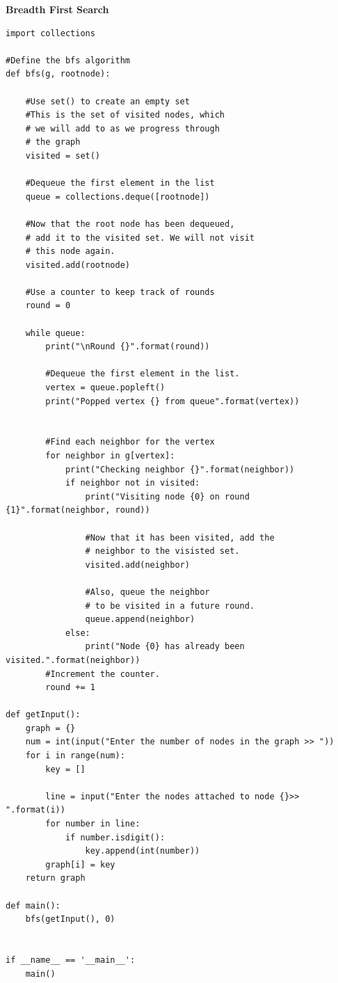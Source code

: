 \documentclass{article}
\begin{document}
\textbf{Breadth First Search}
\begin{lstlisting}
import collections

#Define the bfs algorithm
def bfs(g, rootnode):

    #Use set() to create an empty set
    #This is the set of visited nodes, which 
    # we will add to as we progress through 
    # the graph
    visited = set()

    #Dequeue the first element in the list
    queue = collections.deque([rootnode])

    #Now that the root node has been dequeued,
    # add it to the visited set. We will not visit
    # this node again. 
    visited.add(rootnode)

    #Use a counter to keep track of rounds
    round = 0

    while queue: 
        print("\nRound {}".format(round))

        #Dequeue the first element in the list. 
        vertex = queue.popleft()
        print("Popped vertex {} from queue".format(vertex))


        #Find each neighbor for the vertex
        for neighbor in g[vertex]: 
            print("Checking neighbor {}".format(neighbor))
            if neighbor not in visited: 
                print("Visiting node {0} on round {1}".format(neighbor, round))

                #Now that it has been visited, add the
                # neighbor to the visisted set. 
                visited.add(neighbor) 

                #Also, queue the neighbor 
                # to be visited in a future round. 
                queue.append(neighbor) 
            else:
                print("Node {0} has already been visited.".format(neighbor))
        #Increment the counter. 
        round += 1

def getInput():
    graph = {}
    num = int(input("Enter the number of nodes in the graph >> "))
    for i in range(num):
        key = []

        line = input("Enter the nodes attached to node {}>> ".format(i))
        for number in line:
            if number.isdigit():
                key.append(int(number))
        graph[i] = key
    return graph

def main():
    bfs(getInput(), 0)


if __name__ == '__main__':
    main()
\end{lstlisting}
\end{document}
